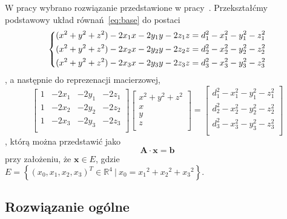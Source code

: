 W pracy wybrano rozwiązanie przedstawione w pracy~\cite{norrdine2012algebraic}. Przekształćmy podstawowy układ równań~\ref{eq:base} do postaci
\begin{equation}
    \begin{dcases}
        (x^2 + y^2 + z^2) - 2x_1x - 2y_1y - 2z_1z = d_1^2 - x_1^2 - y_1^2 - z_1^2\\
        (x^2 + y^2 + z^2) - 2x_2x - 2y_2y - 2z_2z = d_2^2 - x_2^2 - y_2^2 - z_2^2\\
        (x^2 + y^2 + z^2) - 2x_3x - 2y_3y - 2z_3z = d_3^2 - x_3^2 - y_3^2 - z_3^2\\
    \end{dcases}
\end{equation},
a następnie do reprezenacji macierzowej,
\begin{equation}
    \left[
        \begin{matrix}
            1 & -2x_1 & -2y_1 & -2z_1\\
            1 & -2x_2 & -2y_2 & -2z_2\\
            1 & -2x_3 & -2y_3 & -2z_3\\
        \end{matrix}
    \right]
    \left[
        \begin{matrix}
            x^2 + y^2 + z^2\\
            x\\
            y\\
            z\\
        \end{matrix}
    \right]
    =
    \left[
        \begin{matrix}
            d_1^2 - x_1^2 - y_1^2 - z_1^2\\
            d_2^2 - x_2^2 - y_2^2 - z_2^2\\
            d_3^2 - x_3^2 - y_3^2 - z_3^2\\
        \end{matrix}
    \right]
\end{equation},
którą można przedstawić jako
\begin{equation}
    \mathbf{A} \cdot \mathbf{x} = \mathbf{b}
\label{eq:matrix}
\end{equation}
przy założeniu, że $\mathbf{x} \in E$, gdzie $E = \left\{(x_0, x_1, x_2, x_3)^T \in {\mathbb{R}}^4\ |\ x_0 = {x_1}^2 + {x_2}^2 + {x_3}^2\right\}$.

\subsection*{Rozwiązanie ogólne}

